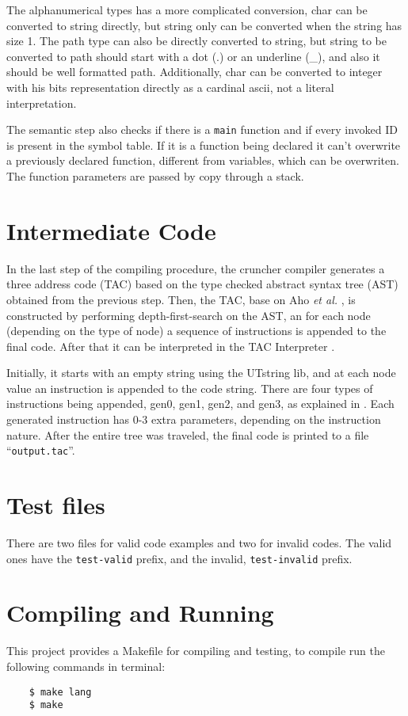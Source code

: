 \documentclass{article}
\begin{document}
The alphanumerical types has a more complicated conversion, char can be
converted to string directly, but string only can be converted when the string
has size 1.  The path type can also be directly converted to string, but string
to be converted to path should start with a dot (.) or an underline (_), and
also it should be well formatted path. Additionally, char can be converted to
integer with his bits representation directly as a cardinal ascii, not a
literal interpretation.

The semantic step also checks if there is a \texttt{main} function and if every
invoked ID is present in the symbol table. If it is a function being declared
it can't overwrite a previously declared function, different from variables,
which can be overwriten. The function parameters are passed by copy through a
stack.

\section{Intermediate Code}
In the last step of the compiling procedure, the cruncher compiler generates a
three address code (TAC) based on the type checked abstract syntax tree (AST)
obtained from the previous step.  Then, the TAC, base on Aho \textit{et al.}
\cite{aho1986compilers}, is constructed by performing depth-first-search on the
AST, an for each node (depending on the type of node) a sequence of
instructions is appended to the final code. After that it can be interpreted in
the TAC Interpreter \cite{santos2020tac}.

Initially, it starts with an empty string using the UTstring lib, and at each
node value an instruction is appended to the code string. There are four types
of instructions being appended, gen0, gen1, gen2, and gen3, as explained in
\cite{aho1986compilers}. Each generated instruction has 0-3 extra parameters,
depending on the instruction nature. After the entire tree was traveled, the
final code is printed to a file ``\texttt{output.tac}''.

\section{Test files}
\label{sec:test}
There are two files for valid code examples and two for invalid codes. The
valid ones have the \texttt{test-valid} prefix, and the invalid,
\texttt{test-invalid} prefix.

\section{Compiling and Running}%
\label{sec:compiling}
This project provides a Makefile for compiling and testing, to compile run the
following commands in terminal:
\begin{verbatim}
    $ make lang
    $ make
\end{verbatim}
\end{document}
